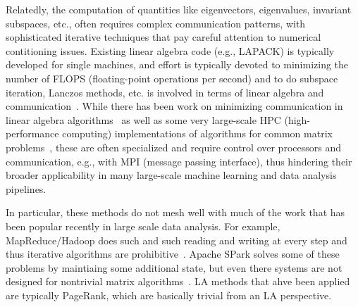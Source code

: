 Relatedly, the computation of quantities like eigenvectors, eigenvalues, invariant subspaces, etc., often requires complex communication patterns, with sophisticated iterative techniques that pay careful attention to numerical contitioning issues.
Existing linear algebra code (e.g., LAPACK) is typically developed for single machines, and effort is typically devoted to minimizing the number of FLOPS (floating-point operations per second) and to do subspace iteration, Lanczos methods, etc. is involved in terms of linear algebra and communication~\cite{templates}.  
While there has been work on minimizing communication in linear algebra algorithms~\cite{BJHS11} as well as some very large-scale HPC (high-performance computing) implementations of algorithms for common matrix problems~\cite{XXX-WHAT-IS-A-GOOD-HPC-LA-REF-HERE}, these are often specialized and require control over processors and communication, e.g., with MPI (message passing interface), thus hindering their broader applicability in many large-scale machine learning and data analysis pipelines.


In particular, these methods do not mesh well with much of the work that has been popular recently in large scale data analysis.
For example, MapReduce/Hadoop does such and such reading and writing at every step and thus iterative algorithms are prohibitive~\cite{DG08_CACM}. 
Apache SPark solves some of these problems by maintiaing some additional state, but even there systems are not designed for nontrivial matrix algorithms~\cite{SPARK_NSDI_12}.
LA methods that ahve been applied are typically PageRank, which are basically trivial from an LA perspective.

